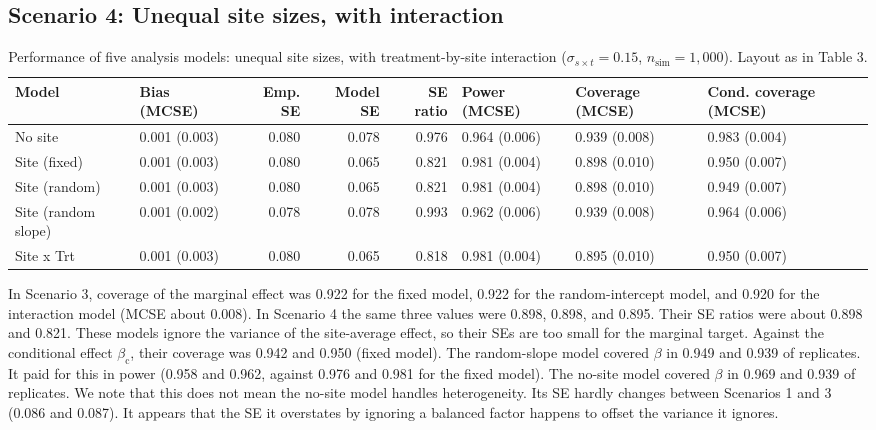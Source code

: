 \documentclass[
  11pt,
]{article}
\begin{document}
\subsection{Scenario 4: Unequal site sizes, with interaction}\label{scenario-4-unequal-site-sizes-with-interaction}

\begin{table}[!h]
\centering
\caption{\label{tab:tab-unequal-int}Performance of five analysis models: unequal site sizes, with treatment-by-site interaction ($\sigma_{s \times t} = 0.15$, $n_{\mathrm{sim}} = 1{,}000$). Layout as in Table 3.}
\centering
\fontsize{8}{10}\selectfont
\begin{tabular}[t]{llrrrlll}
\toprule
Model & Bias (MCSE) & Emp. SE & Model SE & SE ratio & Power (MCSE) & Coverage (MCSE) & Cond. coverage (MCSE)\\
\midrule
No site & 0.001 (0.003) & 0.080 & 0.078 & 0.976 & 0.964 (0.006) & 0.939 (0.008) & 0.983 (0.004)\\
Site (fixed) & 0.001 (0.003) & 0.080 & 0.065 & 0.821 & 0.981 (0.004) & 0.898 (0.010) & 0.950 (0.007)\\
Site (random) & 0.001 (0.003) & 0.080 & 0.065 & 0.821 & 0.981 (0.004) & 0.898 (0.010) & 0.949 (0.007)\\
Site (random slope) & 0.001 (0.002) & 0.078 & 0.078 & 0.993 & 0.962 (0.006) & 0.939 (0.008) & 0.964 (0.006)\\
Site x Trt & 0.001 (0.003) & 0.080 & 0.065 & 0.818 & 0.981 (0.004) & 0.895 (0.010) & 0.950 (0.007)\\
\bottomrule
\end{tabular}
\end{table}

In Scenario 3, coverage of the marginal effect was
0.922 for the fixed model,
0.922 for the random-intercept
model, and 0.920 for the
interaction model (MCSE about
0.008). In
Scenario 4 the same three values were
0.898,
0.898, and
0.895. Their SE ratios were
about 0.898 and
0.821. These models ignore
the variance of the site-average effect, so their SEs are too small
for the marginal target. Against the conditional effect
\(\beta_{\mathrm{c}}\), their coverage was
0.942 and
0.950 (fixed model).
The random-slope model covered \(\beta\) in
0.949 and
0.939 of replicates. It paid
for this in power (0.958 and
0.962, against
0.976 and
0.981 for the fixed model). The
no-site model covered \(\beta\) in
0.969 and
0.939 of replicates. We note
that this does not mean the no-site model handles heterogeneity. Its
SE hardly changes between Scenarios 1 and 3
(0.086 and
0.087). It appears that the
SE it overstates by ignoring a balanced factor happens to offset the
variance it ignores.
\end{document}
